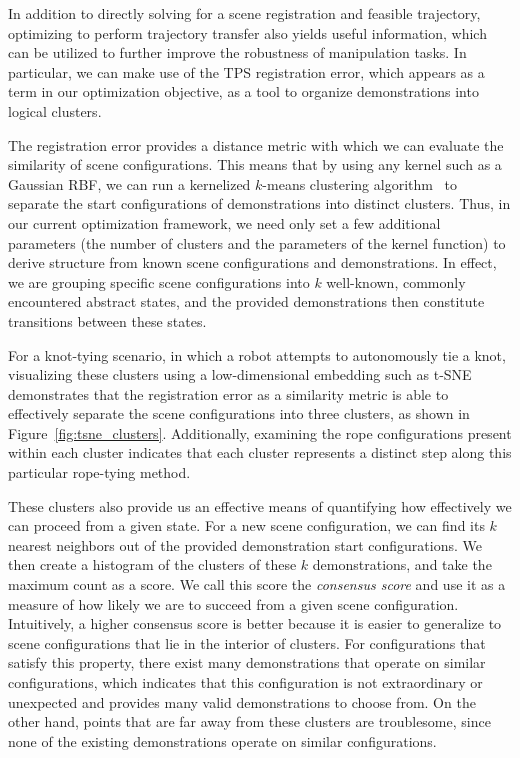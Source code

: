 \documentclass{article}
\begin{document}
In addition to directly solving for a scene registration and feasible trajectory, optimizing to perform trajectory transfer also yields useful information, which can be utilized to further improve the robustness of manipulation tasks. In particular, we can make use of the TPS registration error, which appears as a term in our optimization objective, as a tool to organize demonstrations into logical clusters.

The registration error provides a distance metric with which we can evaluate the similarity of scene configurations. This means that by using any kernel such as a Gaussian RBF, we can run a kernelized $k$-means clustering algorithm~\cite{Dhillon2004} to separate the start configurations of demonstrations into distinct clusters. Thus, in our current optimization framework, we need only set a few additional parameters (the number of clusters and the parameters of the kernel function) to derive structure from known scene configurations and demonstrations. In effect, we are grouping specific scene configurations into $k$ well-known, commonly encountered abstract states, and the provided demonstrations then constitute transitions between these states.

For a knot-tying scenario, in which a robot attempts to autonomously tie a knot, visualizing these clusters using a low-dimensional embedding such as t-SNE~\cite{tSNE2008} demonstrates that the registration error as a similarity metric is able to effectively separate the scene configurations into three clusters, as shown in Figure~\ref{fig:tsne_clusters}. Additionally, examining the rope configurations present within each cluster indicates that each cluster represents a distinct step along this particular rope-tying method.

These clusters also provide us an effective means of quantifying how effectively we can proceed from a given state. For a new scene configuration, we can find its $k$ nearest neighbors out of the provided demonstration start configurations. We then create a histogram of the clusters of these $k$ demonstrations, and take the maximum count as a score. We call this score the \emph{consensus score} and use it as a measure of how likely we are to succeed from a given scene configuration. Intuitively, a higher consensus score is better because it is easier to generalize to scene configurations that lie in the interior of clusters. For configurations that satisfy this property, there exist many demonstrations that operate on similar configurations, which indicates that this configuration is not extraordinary or unexpected and provides many valid demonstrations to choose from. On the other hand, points that are far away from these clusters are troublesome, since none of the existing demonstrations operate on similar configurations.
\end{document}
